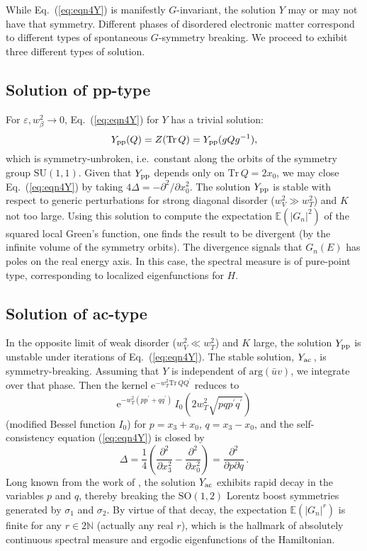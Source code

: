 \documentclass[aps,prl,twocolumn,letterpaper,superscriptaddress]{revtex4-2}
\begin{document}
While Eq.\ (\ref{eq:eqn4Y}) is manifestly $G$-invariant, the solution $Y$ may or may not have that symmetry. Different phases of disordered electronic matter correspond to different types of spontaneous $G$-symmetry breaking. We proceed to exhibit three different types of solution.

\subsection{Solution of pp-type}
For $\varepsilon, w_\beta^2 \to 0$, Eq.\ (\ref{eq:eqn4Y}) for $Y$ has a trivial solution:
\begin{equation}
    Y_{\rm pp} (Q) = Z(\mathrm{Tr}\, Q) = Y_{\rm pp}(g Q g^{-1}) ,
\end{equation}
which is symmetry-unbroken, i.e.\ constant along the orbits of the symmetry group $\mathrm{SU}(1,1)$. Given that $Y_{\rm pp}$ depends only on $\mathrm{Tr}\, Q = 2 x_0$, we may close Eq.\ (\ref{eq:eqn4Y}) by taking $4 \Delta = - \partial^2 / \partial x_0^2$. The solution $Y_{\rm pp}$ is stable with respect to generic perturbations for strong diagonal disorder ($w_V^2 \gg w_T^2$) and $K$ not too large. Using this solution to compute the expectation $\mathbb{E}(|G_n|^2)$ of the squared local Green's function, one finds the result to be divergent (by the infinite volume of the symmetry orbits). The divergence signals that $G_n(E)$ has poles on the real energy axis. In this case, the spectral measure is of pure-point type, corresponding to localized eigenfunctions for $H$. 

\subsection{Solution of ac-type}
In the opposite limit of weak disorder ($w_V^2 \ll w_T^2$) and $K$ large, the solution $Y_{\rm pp}$ is unstable under iterations of Eq.\ (\ref{eq:eqn4Y}). The stable solution, $Y_{\rm ac}\,$, is symmetry-breaking. Assuming that $Y$ is independent of $\mathrm{arg}(\bar{u} v)$, we integrate over that phase. Then the kernel $\mathrm{e}^{- w_T^2 \mathrm{Tr}\, Q Q^\prime}$ reduces to
\begin{equation}
    \mathrm{e}^{-w_T^2 (p p^\prime + q q^\prime)} \, I_0(2w_T^2 \sqrt{p q p^\prime q^\prime})
\end{equation}
(modified Bessel function $I_0$) for $p = x_3 + x_0$, $q = x_3 - x_0$, and the self-consistency equation (\ref{eq:eqn4Y}) is closed by
\begin{equation}
    \Delta = \frac{1}{4} \left( \frac{\partial^2}{\partial x_3^2} - \frac{\partial^2}{\partial x_0^2} \right) = \frac{\partial^2}{\partial p \partial q}\,.
\end{equation}
Long known from the work of \cite{MF1992, AbelKlein98, AW2013}, the solution $Y_{\rm ac}$ exhibits rapid decay in the variables $p$ and $q$, thereby breaking the $\mathrm{SO}(1,2)$ Lorentz boost symmetries generated by $\sigma_1$ and $\sigma_2$. By virtue of that decay, the expectation $\mathbb{E}(|G_n|^{r})$ is finite for any $r \in 2\mathbb{N}$ (actually any real $r$), which is the hallmark of absolutely continuous spectral measure and ergodic eigenfunctions of the Hamiltonian.
\end{document}

